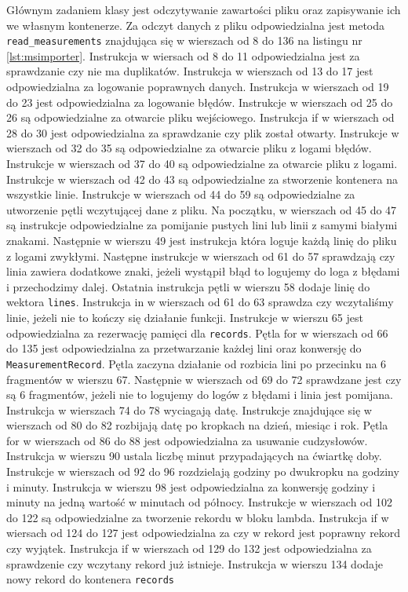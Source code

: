 Głównym zadaniem klasy jest odczytywanie zawartości pliku oraz zapisywanie ich we własnym kontenerze. Za odczyt danych z pliku odpowiedzialna jest metoda \texttt{read\_measurements} znajdująca się w wierszach od 8 do 136 na listingu nr \ref{lst:msimporter}.
Instrukcja w wiersach od 8 do 11 odpowiedzialna jest za sprawdzanie czy nie ma duplikatów.
Instrukcja w wierszach od 13 do 17 jest odpowiedzialna za logowanie poprawnych danych.
Instrukcja w wierszach od 19 do 23 jest odpowiedzialna za logowanie błędów.
Instrukcje w wierszach od 25 do 26 są odpowiedzialne za otwarcie pliku wejściowego.
Instrukcja if w wierszach od 28 do 30 jest odpowiedzialna za sprawdzanie czy plik został otwarty.
Instrukcje w wierszach od 32 do 35 są odpowiedzialne za otwarcie pliku z logami błędów.
Instrukcje w wierszach od 37 do 40 są odpowiedzialne za otwarcie pliku z logami.
Instrukcje w wierszach od 42 do 43 są odpowiedzialne za stworzenie kontenera na wszystkie linie.
Instrukcje w wierszach od 44 do 59 są odpowiedzialne za utworzenie pętli wczytującej dane z pliku. Na początku, w wierszach od 45 do 47 są instrukcje odpowiedzialne za pomijanie pustych lini lub linii z samymi białymi znakami. Następnie w wierszu 49 jest instrukcja która loguje każdą linię do pliku z logami zwykłymi. Następne instrukcje w wierszach od 61 do 57 sprawdzają czy linia zawiera dodatkowe znaki, jeżeli wystąpił błąd to logujemy do loga z błędami i przechodzimy dalej. Ostatnia instrukcja pętli w wierszu 58 dodaje linię do wektora \texttt{lines}.
Instrukcja in w wierszach od 61 do 63 sprawdza czy wczytaliśmy linie, jeżeli nie to kończy się działanie funkcji.
Instrukcje w wierszu 65 jest odpowiedzialna za rezerwację pamięci dla \texttt{records}.
Pętla for w wierszach od 66 do 135 jest odpowiedzialna za przetwarzanie każdej lini oraz konwersję do \texttt{MeasurementRecord}. Pętla zaczyna działanie od rozbicia lini po przecinku na 6 fragmentów w wierszu 67. Następnie w wierszach od 69 do 72 sprawdzane jest czy są 6 fragmentów, jeżeli nie to logujemy do logów z błędami i linia jest pomijana. Instrukcja w wierszach 74 do 78 wyciagają datę. Instrukcje znajdujące się w wierszach od 80 do 82 rozbijają datę po kropkach na dzień, miesiąc i rok.
Pętla for w wierszach od 86 do 88 jest odpowiedzialna za usuwanie cudzysłowów. Instrukcja w wierszu 90 ustala liczbę minut przypadających na ćwiartkę doby. Instrukcje w wierszach od 92 do 96 rozdzielają godziny po dwukropku na godziny i minuty.
Instrukcja w wierszu 98 jest odpowiedzialna za konwersję godziny i minuty na jedną wartość w minutach od północy.
Instrukcje w wierszach od 102 do 122 są odpowiedzialne za tworzenie rekordu w bloku lambda.
Instrukcja if w wiersach od 124 do 127 jest odpowiedzialna za czy w rekord jest poprawny rekord czy wyjątek.
Instrukcja if w wierszach od 129 do 132 jest odpowiedzialna za sprawdzenie czy wczytany rekord już istnieje.
Instrukcja w wierszu 134 dodaje nowy rekord do kontenera \texttt{records}